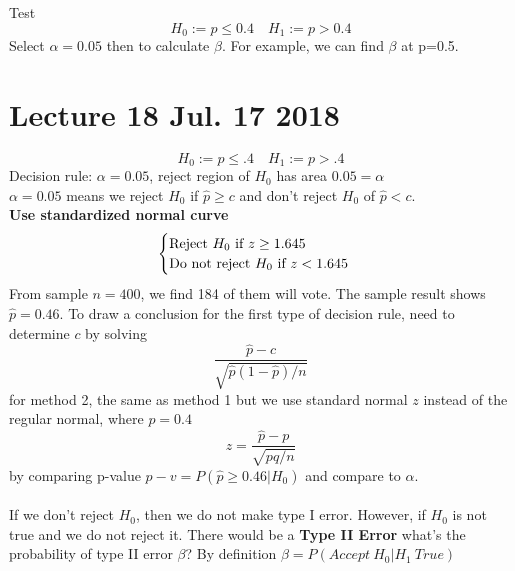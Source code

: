 \documentclass{article}
\begin{document}
		\begin{example}
			Test 
			\[
				H_0 := p \leq 0.4 \quad
				H_1 := p > 0.4
			\]
			Select $\alpha = 0.05$ then to calculate $\beta$. For example, we can find $\beta$ at p=0.5.
		\end{example}



	\section{Lecture 18 Jul. 17 2018}
		\begin{example}
			\[
				H_0 := p \leq .4 \quad
				H_1 := p > .4
			\]
			Decision rule: $\alpha = 0.05$, reject region of $H_0$ has area $0.05 = \alpha$
			\\
			$\alpha = 0.05$ means we reject $H_0$ if $\hat{p} \geq c$ and don't reject $H_0$ of $\hat{p} < c$.
			\\
			\textbf{Use standardized normal curve} 
			\[
				\begin{cases}
					\text{{Reject $H_0$ if }} z \geq 1.645 \\
					\text{{Do not reject $H_0$ if }} z < 1.645
				\end{cases}
			\]
			From sample $n=400$, we find 184 of them will vote. The sample result shows $\hat{p} = 0.46$.
			To draw a conclusion for the first type of decision rule, need to determine $c$ by solving
			\[
				\frac{\hat{p}-c}{\sqrt{\hat{p}(1-\hat{p})/n}}
			\]
			for method 2, the same as method 1 but we use standard normal $z$ instead of the regular normal, where $p=0.4$
			\[
				z = \frac{\hat{p} - p}{\sqrt{pq/n}}
			\]
			by comparing p-value $p-v = P(\hat{p} \geq 0.46 | H_0)$ and compare to $\alpha$.
		\end{example}

		\paragraph{} If we don't reject $H_0$, then we do not make type I error. However, if $H_0$ is not true and we do not reject it. 
			There would be a \textbf{Type II Error} what's the probability of type II error $\beta$? By definition $\beta=P(Accept\ H_0 | H_1 \ True)$
			
\end{document}

